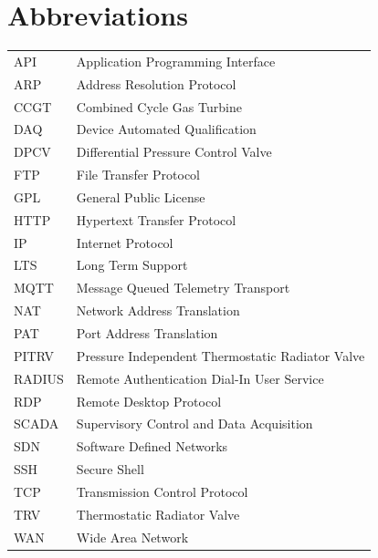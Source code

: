 \documentclass[11pt, oneside]{book}   	%
\begin{document}
\chapter*{Abbreviations}
\small
\begin{table}[H]
	\begin{small}
	\begin{center}
	\begin{tabular}{l  l}
	API&Application Programming Interface\\
	ARP&Address Resolution Protocol\\
	CCGT&Combined Cycle Gas Turbine\\
	DAQ&Device Automated Qualification\\
	DPCV&Differential Pressure Control Valve\\
	FTP&File Transfer Protocol\\
	GPL&General Public License\\
	HTTP&Hypertext Transfer Protocol\\
	IP&Internet Protocol\\
	LTS&Long Term Support\\
	MQTT&Message Queued Telemetry Transport\\
	NAT&Network Address Translation\\
	PAT&Port Address Translation\\
	PITRV&Pressure Independent Thermostatic Radiator Valve\\
	RADIUS&Remote Authentication Dial-In User Service\\
	RDP&Remote Desktop Protocol\\
	SCADA&Supervisory Control and Data Acquisition\\
	SDN&Software Defined Networks\\
	SSH&Secure Shell\\
	TCP&Transmission Control Protocol\\
	TRV&Thermostatic Radiator Valve\\
	WAN&Wide Area Network\\
	\end{tabular}
	\end{center}
	\end{small}
	\label{Abbreviations}
\end{table}

\normalsize

\newpage
\thispagestyle{empty}
\mbox{}
\newpage

\newpage

\tableofcontents
\end{document}
